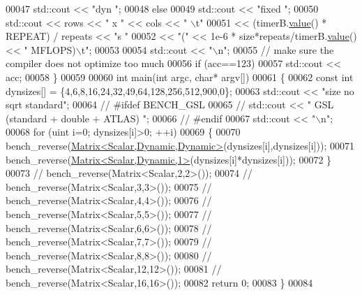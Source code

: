 \begin{DoxyCode}
00047     std::cout << \textcolor{stringliteral}{"dyn   "};
00048   \textcolor{keywordflow}{else}
00049     std::cout << \textcolor{stringliteral}{"fixed "};
00050   std::cout << rows << \textcolor{stringliteral}{" x "} << cols << \textcolor{stringliteral}{" \(\backslash\)t"}
00051             << (timerB.\hyperlink{class_eigen_1_1_bench_timer_a26760f963ed8b64c126159bfea57735e}{value}() * REPEAT) / repeats << \textcolor{stringliteral}{"s "}
00052             << \textcolor{stringliteral}{"("} << 1e-6 * size*repeats/timerB.\hyperlink{class_eigen_1_1_bench_timer_a26760f963ed8b64c126159bfea57735e}{value}() << \textcolor{stringliteral}{" MFLOPS)\(\backslash\)t"};
00053 
00054   std::cout << \textcolor{stringliteral}{"\(\backslash\)n"};
00055   \textcolor{comment}{// make sure the compiler does not optimize too much}
00056   \textcolor{keywordflow}{if} (acc==123)
00057     std::cout << acc;
00058 \}
00059 
00060 \textcolor{keywordtype}{int} main(\textcolor{keywordtype}{int} argc, \textcolor{keywordtype}{char}* argv[])
00061 \{
00062   \textcolor{keyword}{const} \textcolor{keywordtype}{int} dynsizes[] = \{4,6,8,16,24,32,49,64,128,256,512,900,0\};
00063   std::cout << \textcolor{stringliteral}{"size            no sqrt                           standard"};
00064 \textcolor{comment}{//   #ifdef BENCH\_GSL}
00065 \textcolor{comment}{//   std::cout << "       GSL (standard + double + ATLAS)  ";}
00066 \textcolor{comment}{//   #endif}
00067   std::cout << \textcolor{stringliteral}{"\(\backslash\)n"};
00068   \textcolor{keywordflow}{for} (uint i=0; dynsizes[i]>0; ++i)
00069   \{
00070     bench\_reverse(\hyperlink{group___core___module}{Matrix<Scalar,Dynamic,Dynamic>}(dynsizes[i],dynsizes[i]));
00071     bench\_reverse(\hyperlink{group___core___module}{Matrix<Scalar,Dynamic,1>}(dynsizes[i]*dynsizes[i]));
00072   \}
00073 \textcolor{comment}{//   bench\_reverse(Matrix<Scalar,2,2>());}
00074 \textcolor{comment}{//   bench\_reverse(Matrix<Scalar,3,3>());}
00075 \textcolor{comment}{//   bench\_reverse(Matrix<Scalar,4,4>());}
00076 \textcolor{comment}{//   bench\_reverse(Matrix<Scalar,5,5>());}
00077 \textcolor{comment}{//   bench\_reverse(Matrix<Scalar,6,6>());}
00078 \textcolor{comment}{//   bench\_reverse(Matrix<Scalar,7,7>());}
00079 \textcolor{comment}{//   bench\_reverse(Matrix<Scalar,8,8>());}
00080 \textcolor{comment}{//   bench\_reverse(Matrix<Scalar,12,12>());}
00081 \textcolor{comment}{//   bench\_reverse(Matrix<Scalar,16,16>());}
00082   \textcolor{keywordflow}{return} 0;
00083 \}
00084 
\end{DoxyCode}
